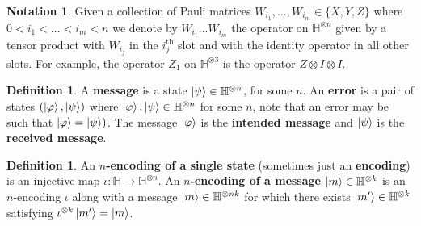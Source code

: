 \documentclass[12pt]{article}
\theoremstyle{plain}
\theoremstyle{definition}
\newtheorem{defn}[thm]{Definition} %
\newtheorem{notation}[thm]{Notation}
\newcommand{\bb}[1]{\mathbb{#1}}
\newcommand{\lto}{\longrightarrow}
\begin{document}
	\begin{notation}
		Given a collection of Pauli matrices $W_{i_1},...,W_{i_m} \in \lbrace X,Y,Z\rbrace$ where $0 < i_1 < \hdots < i_m < n$ we denote by $W_{i_1}...W_{i_m}$ the operator on $\bb{H}^{\otimes n}$ given by a tensor product with $W_{i_j}$ in the $i_j^{\text{th}}$ slot and with the identity operator in all other slots. For example, the operator $Z_1$ on $\bb{H}^{\otimes 3}$ is the operator $Z \otimes I \otimes I$.
	\end{notation}
	
	
	\begin{defn}
		A \textbf{message} is a state $\ket{\psi} \in \bb{H}^{\otimes n}$, for some $n$. An \textbf{error} is a pair of states $(\ket{\varphi},\ket{\psi})$ where $\ket{\varphi},\ket{\psi} \in \bb{H}^{\otimes n}$ for some $n$, note that an error may be such that $\ket{\varphi} = \ket{\psi})$.  The message $\ket{\varphi}$ is the \textbf{intended message} and $\ket{\psi}$ is the \textbf{received message}. 
	\end{defn}
	\begin{defn}
		An \textbf{$n$-encoding of a single state} (sometimes just an \textbf{encoding}) is an injective map $\iota: \bb{H} \lto \bb{H}^{\otimes n}$. An \textbf{$n$-encoding of a message} $\ket{m} \in \bb{H}^{\otimes k}$ is an $n$-encoding $\iota$ along with a message $\ket{m} \in \bb{H}^{\otimes nk}$ for which there exists $\ket{m'} \in \bb{H}^{\otimes k}$ satisfying $\iota^{\otimes k}\ket{m'} = \ket{m}$.
	\end{defn}
	
\end{document}
